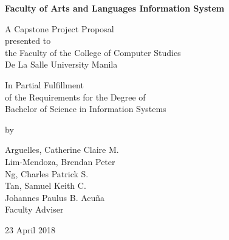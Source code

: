 
\begin{titlepage}
\begin{center}

\textbf{
Faculty of Arts and Languages Information System
}

\vspace{5em}
A Capstone Project Proposal\\
presented to\\
the Faculty of the College of Computer Studies\\
De La Salle University Manila

\vspace{5em}
In Partial Fulfillment\\
of the Requirements for the Degree of\\
Bachelor of Science in Information Systems

\vspace{4em}

by\\

\vspace{4em}

Arguelles, Catherine Claire M.\\
Lim-Mendoza, Brendan Peter \\
Ng, Charles Patrick S.  \\
Tan, Samuel Keith C. \\


\vspace{4em}
Johannes Paulus B. Acuña\\
Faculty Adviser

\vspace{4em}
23 April 2018

\pagebreak
\end{center}
\end{titlepage}